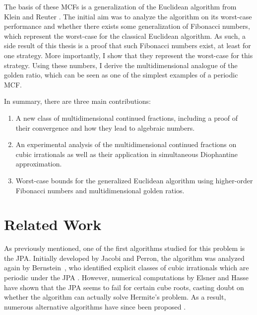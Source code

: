 The basis of these MCFs is a generalization of the Euclidean algorithm from
Klein and Reuter \cite{Klein24}.
The initial aim was to analyze the algorithm on its worst-case performance
and whether there exists some generalization of Fibonacci numbers,
which represent the worst-case for the classical Euclidean algorithm.
As such, a side result of this thesis is a proof that such Fibonacci numbers exist, at least for one strategy.
More importantly, I show that they represent the worst-case for this strategy.
Using these numbers, I derive the multidimensional analogue of the golden
ratio, which can be seen as one of the simplest examples of a periodic MCF.

In summary, there are three main contributions:
\begin{enumerate}
  \item A new class of multidimensional continued fractions, including a proof
    of their convergence and how they lead to algebraic numbers.
  \item An experimental analysis of the multidimensional continued fractions
    on cubic irrationals as well as their application in simultaneous
    Diophantine approximation.
  \item Worst-case bounds for the generalized Euclidean algorithm
    using higher-order Fibonacci numbers and multidimensional golden ratios.
\end{enumerate}

\section{Related Work}
\label{sec:related-work}

As previously mentioned,
one of the first algorithms studied for this problem is the JPA.
Initially developed by Jacobi and Perron,
the algorithm was analyzed again by Bernstein~\cite{Bernstein71},
who identified explicit classes of cubic irrationals which are periodic under
the JPA \cite{Bernstein64A, Bernstein65, Bernstein64B}.
However, numerical computations by Elsner and Hasse \cite{Elsner67} have shown
that the JPA seems to fail for certain cube roots,
casting doubt on whether the algorithm can actually solve Hermite’s problem.
As a result, numerous alternative algorithms have since been proposed
\cite{Assaf05, Hendy81, Schweiger13, Schweiger00}.

